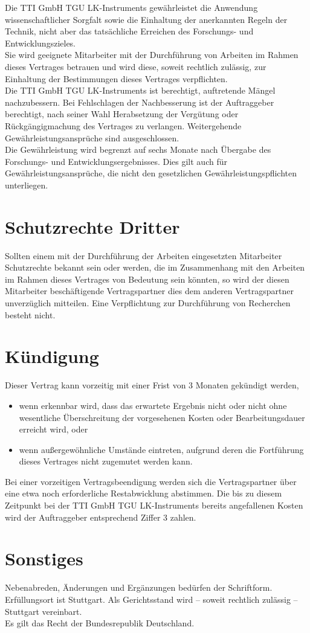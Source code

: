 \documentclass[a4paper, final, 11pt, oneside]{scrartcl}
\begin{document}
\begin{multicols}{2}
Die TTI GmbH TGU LK-Instruments gewährleistet die Anwendung wissenschaftlicher Sorgfalt sowie die Einhaltung der anerkannten Regeln der Technik, nicht aber das tatsächliche Erreichen des Forschungs- und Entwicklungszieles.\\
Sie wird geeignete Mitarbeiter mit der Durchführung von Arbeiten im Rahmen dieses Vertrages betrauen und wird diese, soweit rechtlich zulässig, zur Einhaltung der Bestimmungen dieses Vertrages verpflichten.\\
Die TTI GmbH TGU LK-Instruments ist berechtigt, auftretende Mängel nachzubessern. Bei Fehlschlagen der Nachbesserung ist der Auftraggeber berechtigt, nach seiner Wahl Herabsetzung der Vergütung oder Rückgängigmachung des Vertrages zu verlangen. Weitergehende Gewährleistungsansprüche sind ausgeschlossen.\\
Die Gewährleistung wird begrenzt auf sechs Monate nach Übergabe des Forschungs- und Entwicklungsergebnisses. Dies gilt auch für Gewährleistungsansprüche, die nicht den gesetzlichen Gewährleistungspflichten unterliegen.

\section{Schutzrechte Dritter}
Sollten einem mit der Durchführung der Arbeiten eingesetzten Mitarbeiter Schutzrechte bekannt sein oder werden, die im Zusammenhang mit den Arbeiten im Rahmen dieses Vertrages von Bedeutung sein könnten, so wird der diesen Mitarbeiter beschäftigende Vertragspartner dies dem anderen Vertragspartner unverzüglich mitteilen. Eine Verpflichtung zur Durchführung von Recherchen besteht nicht.

\section{Kündigung}
Dieser Vertrag kann vorzeitig mit einer Frist von 3 Monaten gekündigt werden,
\begin{itemize}
\item wenn erkennbar wird, dass das erwartete Ergebnis nicht oder nicht ohne wesentliche Überschreitung der vorgesehenen Kosten oder Bearbeitungsdauer erreicht wird, oder
\item wenn außergewöhnliche Umstände eintreten, aufgrund deren die Fortführung dieses Vertrages nicht zugemutet werden kann.
\end{itemize}
Bei einer vorzeitigen Vertragsbeendigung werden sich die Vertragspartner über eine etwa noch erforderliche Restabwicklung abstimmen. Die bis zu diesem Zeitpunkt bei der TTI GmbH TGU LK-Instruments bereits angefallenen Kosten wird der Auftraggeber entsprechend Ziffer 3 zahlen.

\section{Sonstiges}
Nebenabreden, Änderungen und Ergänzungen bedürfen der Schriftform.\\
Erfüllungsort ist Stuttgart. Als Gerichtsstand wird -- soweit rechtlich zulässig -- Stuttgart vereinbart.\\
Es gilt das Recht der Bundesrepublik Deutschland.

\end{multicols}
\end{document}

